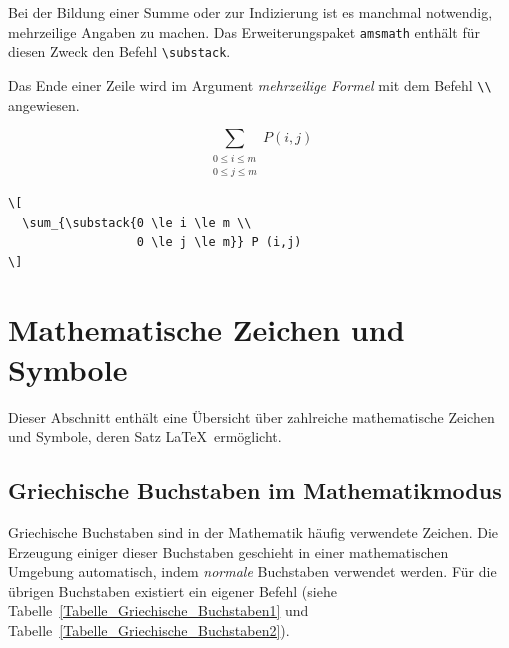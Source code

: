 \documentclass[a4paper,10pt,twoside]{scrbook}
\begin{document}
{Bei der Bildung einer Summe oder zur Indizierung ist 
es manchmal notwendig, mehrzeilige Angaben 
zu machen. Das Erweiterungspaket \verb!amsmath! enthält für diesen Zweck
den Befehl \verb!\substack!.  


Das Ende einer Zeile wird im 
Argument \textsl{mehrzeilige Formel}
mit dem Befehl \verb!\\! angewiesen.


\begin{minipage}[c]{.4\textwidth}
\setlength{\parskip}{1em}
\[
  \sum_{\substack{0 \le i \le m \\
                  0 \le j \le m}} P (i,j)
\]
\end{minipage}
\hfill
\begin{minipage}[c]{.58\textwidth}
\setlength{\parskip}{1em}
\begin{lstlisting}[label=substackbeispiel, style=customlatex]
\[
  \sum_{\substack{0 \le i \le m \\
                  0 \le j \le m}} P (i,j)
\]
\end{lstlisting}
\end{minipage}

\section{Mathematische Zeichen und Symbole}

Dieser Abschnitt enthält eine Übersicht über zahlreiche 
mathematische Zeichen und Symbole, deren Satz \LaTeX\ ermöglicht.


\subsection{Griechische Buchstaben im Mathematikmodus} 

Griechische Buchstaben sind in der
Mathematik häufig verwendete Zeichen. Die Erzeugung einiger dieser
Buchstaben geschieht in einer mathematischen Umgebung automatisch, indem \textsl{normale} 
Buchstaben verwendet werden. Für die übrigen Buchstaben existiert ein eigener Befehl 
(siehe Tabelle~\ref{Tabelle_Griechische_Buchstaben1} und Tabelle~\ref{Tabelle_Griechische_Buchstaben2}). 

}
\end{document}
